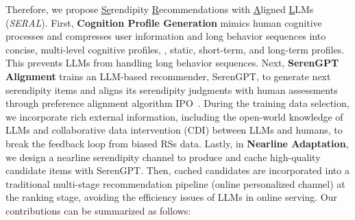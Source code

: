 


Therefore, we propose \underline{Se}rendipity \underline{R}ecommendations with \underline{A}ligned \underline{L}LMs (\textit{SERAL}). First, \textbf{Cognition Profile Generation} mimics human cognitive processes and compresses user information and long behavior sequences into concise, multi-level cognitive profiles, \eg, static, short-term, and long-term profiles. This prevents LLMs from handling long behavior sequences. Next, \textbf{SerenGPT Alignment} trains an LLM-based recommender, SerenGPT, to generate next serendipity items and aligns its serendipity judgments with human assessments through preference alignment algorithm IPO~\cite{azar2024general}. During the training data selection, we incorporate rich external information, including the open-world knowledge of LLMs and collaborative data intervention (CDI) between LLMs and humans, to break the feedback loop from biased RSs data. Lastly, in \textbf{Nearline Adaptation}, we design a nearline serendipity channel to produce and cache high-quality candidate items with SerenGPT. Then, cached candidates are incorporated into a traditional multi-stage recommendation pipeline (online personalized channel) at the ranking stage, avoiding the efficiency issues of LLMs in online serving. Our contributions can be summarized as follows:
